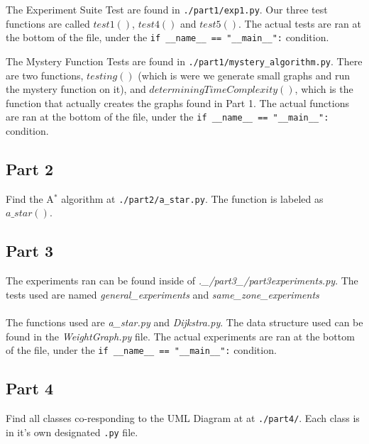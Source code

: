 \documentclass{article}
\begin{document}
The Experiment Suite Test are found in \verb|./part1/exp1.py|. Our three test functions are called $test1()$, $test4()$ and  $test5()$. The actual tests are ran at the bottom of the file, under the \verb|if __name__ == "__main__":| condition.

The Mystery Function Tests are found in \verb|./part1/mystery_algorithm.py|. There are two functions, $testing()$ (which is were we generate small graphs and run the mystery function on it), and $determiningTimeComplexity()$, which is the function that actually creates the graphs found in Part 1. The actual functions are ran at the bottom of the file, under the \verb|if __name__ == "__main__":| condition.

\subsection{Part 2}

Find the A$^{*}$ algorithm at \verb|./part2/a_star.py|. The function is labeled as $a\_star()$.

\subsection{Part 3}

The experiments ran can be found inside of \emph{.\_/part3\_/part3experiments.py}. The tests used are named \emph{general\_experiments} and \emph{same\_zone\_experiments} \\
\\
The functions used are \emph{a\_star.py} and \emph{Dijkstra.py}. The data structure used can be found in the \emph{WeightGraph.py} file. The actual experiments are ran at the bottom of the file, under the \verb|if __name__ == "__main__":| condition.

\subsection{Part 4}


Find all classes co-responding to the UML Diagram at at \verb|./part4/|. Each class is in it's own designated \verb|.py| file.
\end{document}
